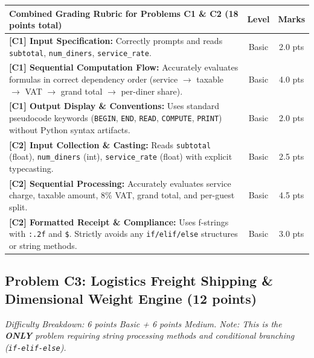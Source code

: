 \documentclass[11pt,a4paper]{article}
\begin{document}
\vspace{0.4mm}
\begin{center}
\renewcommand{\arraystretch}{1.08}
\setlength{\tabcolsep}{3.5pt}
\begin{tabularx}{\textwidth}{|X|c|c|}
\hline
\textbf{Combined Grading Rubric for Problems C1 \& C2 (18 points total)} & \textbf{Level} & \textbf{Marks} \\
\hline
\textbf{[C1] Input Specification:} Correctly prompts and reads \texttt{subtotal}, \texttt{num\_diners}, \texttt{service\_rate}. & Basic & 2.0 pts \\
\hline
\textbf{[C1] Sequential Computation Flow:} Accurately evaluates formulas in correct dependency order (service $\rightarrow$ taxable $\rightarrow$ VAT $\rightarrow$ grand total $\rightarrow$ per-diner share). & Basic & 4.0 pts \\
\hline
\textbf{[C1] Output Display \& Conventions:} Uses standard pseudocode keywords (\texttt{BEGIN}, \texttt{END}, \texttt{READ}, \texttt{COMPUTE}, \texttt{PRINT}) without Python syntax artifacts. & Basic & 2.0 pts \\
\hline
\hline
\textbf{[C2] Input Collection \& Casting:} Reads \texttt{subtotal} (float), \texttt{num\_diners} (int), \texttt{service\_rate} (float) with explicit typecasting. & Basic & 2.5 pts \\
\hline
\textbf{[C2] Sequential Processing:} Accurately evaluates service charge, taxable amount, 8\% VAT, grand total, and per-guest split. & Basic & 4.5 pts \\
\hline
\textbf{[C2] Formatted Receipt \& Compliance:} Uses f-strings with \texttt{:.2f} and \texttt{\$}. Strictly avoids any \texttt{if/elif/else} structures or string methods. & Basic & 3.0 pts \\
\hline
\end{tabularx}
\end{center}

\newpage

\subsection*{Problem C3: Logistics Freight Shipping \& Dimensional Weight Engine (12 points)}
\textit{Difficulty Breakdown: 6 points Basic + 6 points Medium. Note: This is the \textbf{ONLY} problem requiring string processing methods and conditional branching (\texttt{if-elif-else}).}
\end{document}
